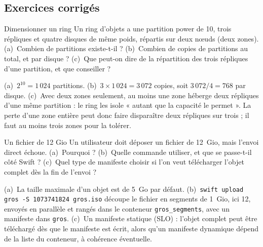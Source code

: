 \subsection{Exercices corrigés}\label{sec:sw-exercices}

\begin{exercice}{Dimensionner un ring}\label{ex:sw-ring}
Un ring d'objets a une partition power de 10, trois répliques et quatre disques de même poids, répartis sur deux nœuds
(deux zones). (a)~Combien de partitions existe-t-il ? (b)~Combien de copies de partitions au total, et par disque ?
(c)~Que peut-on dire de la répartition des trois répliques d'une partition, et que conseiller ?
\end{exercice}
\begin{correction}
(a)~$2^{10} = 1\,024$ partitions. (b)~$3 \times 1\,024 = 3\,072$ copies, soit $3\,072 / 4 = 768$ par disque. (c)~Avec deux zones
seulement, au moins une zone héberge deux répliques d'une même partition : le ring les isole « autant que la capacité le
permet ». La perte d'une zone entière peut donc faire disparaître deux répliques sur trois ; il faut au moins trois zones
pour la tolérer.
\end{correction}

\begin{exercice}{Un fichier de 12 Gio}\label{ex:sw-gros}
Un utilisateur doit déposer un fichier de 12~Gio, mais l'envoi direct échoue. (a)~Pourquoi ? (b)~Quelle commande
utiliser, et que se passe-t-il côté Swift ? (c)~Quel type de manifeste choisir si l'on veut télécharger l'objet complet dès
la fin de l'envoi ?
\end{exercice}
\begin{correction}
(a)~La taille maximale d'un objet est de 5~Go par défaut. (b)~\texttt{swift upload gros -S 1073741824 gros.iso} découpe le
fichier en segments de 1~Gio, ici 12, envoyés en parallèle et rangés dans le conteneur \texttt{gros\_segments}, avec un
manifeste dans \texttt{gros}. (c)~Un manifeste statique (SLO) : l'objet complet peut être téléchargé dès que le manifeste est
écrit, alors qu'un manifeste dynamique dépend de la liste du conteneur, à cohérence éventuelle.
\end{correction}

